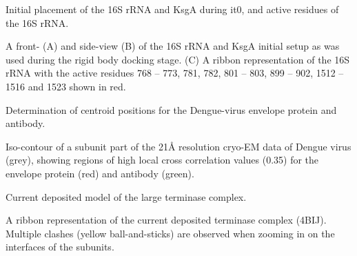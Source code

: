 \caption{Initial placement of the 16S rRNA and KsgA during it0, and active
residues of the 16S rRNA.}
{A front- (A) and side-view (B) of the 16S rRNA and
KsgA initial setup as was used during the rigid body docking stage. 
(C) A ribbon representation of the 16S rRNA with the active residues 768 – 773,
781, 782, 801 – 803, 899 – 902, 1512 – 1516 and 1523 shown in red.}
\stopbuffer

\caption{Determination of centroid positions for the Dengue-virus envelope
protein and antibody.}
{Iso-contour of a subunit part of the 21Å resolution cryo-EM data of
Dengue virus (grey), showing regions of high local cross correlation values
(0.35) for the envelope protein (red) and antibody (green).} 
\stopbuffer

\caption{Current deposited model of the large terminase complex.}
{A ribbon representation of the current deposited terminase complex (4BIJ).
Multiple clashes (yellow ball-and-sticks) are observed when zooming in on the
interfaces of the subunits.}
\stopbuffer
